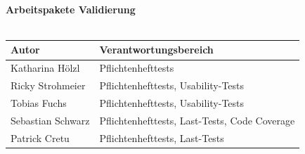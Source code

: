 \documentclass[a4paper, 12pt]{scrreprt}
\begin{document}
\begin{titlepage}
\begin{center}
        \ \\
        \ \\
       
        \hspace{3 cm}\\
         \textbf{Arbeitspakete Validierung} \\
         \ \\
         
         \begin{tabular}{ | l | l |}
         	\hline
         	\textbf{Autor} & \textbf{Verantwortungsbereich} \\ \hline
         	Katharina Hölzl & Pflichtenhefttests\\ \hline
         	Ricky Strohmeier& Pflichtenhefttests, Usability-Tests \\ \hline
         	Tobias Fuchs & Pflichtenhefttests, Usability-Tests \\ \hline
         	Sebastian Schwarz & Pflichtenhefttests, Last-Tests, Code Coverage \\ \hline  
         	Patrick Cretu  &  Pflichtenhefttests, Last-Tests  \\ \hline
         \end{tabular}       
       
       
        
        
    \end{center}
\end{titlepage}


\tableofcontents








\end{document}
